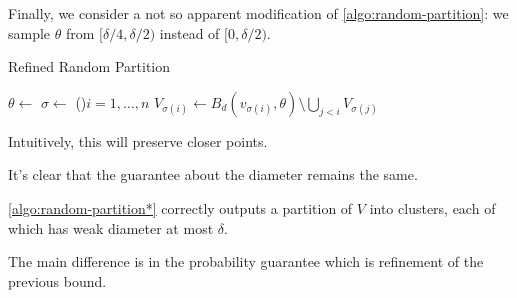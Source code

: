 Finally, we consider a not so apparent modification of \autoref{algo:random-partition}: we sample \(\theta \) from \([\delta / 4, \delta / 2)\) instead of \([0, \delta / 2)\).

\begin{algorithm}[H]\label{algo:random-partition*}
	\DontPrintSemicolon{}
	\caption{Refined Random Partition~\cite{calinescu2005approximation}}

	\BlankLine

	\(\theta \gets\)\uniform{\([\delta / 4, \delta / 2)\)}\;
	\(\sigma \gets\)
	\For(){\(i = 1, \dots , n\)}{
		\(V_{\sigma (i)} \gets B_d(v_{\sigma (i)}, \theta ) \setminus \bigcup_{j < i} V_{\sigma (j)}\)\;
	}
	\;
\end{algorithm}

\begin{intuition}
	Intuitively, this will preserve closer points.
\end{intuition}

It's clear that the guarantee about the diameter remains the same.

\begin{claim}
	\autoref{algo:random-partition*} correctly outputs a partition of \(V\) into clusters, each of which has weak diameter at most \(\delta \).
\end{claim}

The main difference is in the probability guarantee which is refinement of the previous bound.

